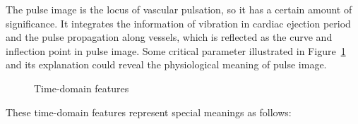 The pulse image is the locus of vascular pulsation, so it has a
certain amount of significance. It integrates the information of 
vibration in cardiac ejection period and the pulse propagation along
vessels, which is reflected as the curve and inflection point in pulse
image. Some critical parameter illustrated in Figure~\ref{fig:timefeatures} and its
explanation could reveal the physiological meaning of pulse image.
\begin{figure}
    \centering
    \caption{Time-domain features}
    \label{fig:timefeatures}
\end{figure}

These time-domain features represent special meanings as follows:
